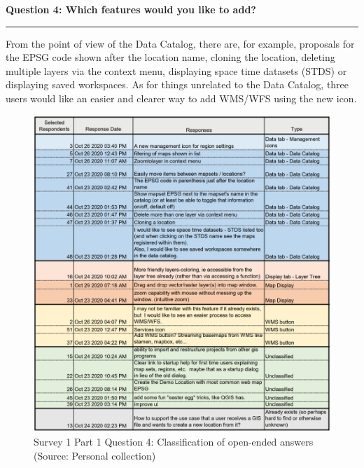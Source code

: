 \documentclass[a4paper,10pt,twoside]{article}
\begin{document}
\newpage
\noindent \textbf{Question 4: Which features would you like to add?}
\par\noindent\rule{\textwidth}{0.4pt}
\noindent From the point of view of the Data Catalog, there are, for example, proposals for the EPSG code shown after the location name, cloning the location, deleting multiple layers via the context menu, displaying space time datasets (STDS) or displaying saved workspaces. As for things unrelated to the Data Catalog, three users would like an easier and clearer way to add WMS/WFS using the new icon.

\begin{figure}[hbt!] 
\begin{center}
\includegraphics[width=16cm]{../surveys/analyzed_data/survey1_part1_question4_open_ended.png} 
\caption[Survey 1 Part 1 Question 4: Classification of open-ended answers]{Survey 1 Part 1 Question 4: Classification of open-ended answers (Source: Personal collection)}
\label{fig:survey1_part1_question4_open_ended}
\end{center}
\end{figure}
\end{document}
